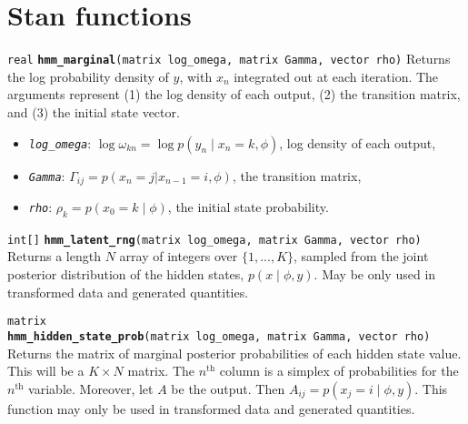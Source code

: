\documentclass[
  10pt,
]{book}
\begin{document}
\hypertarget{hmm-stan-functions}{%
\section{Stan functions}\label{hmm-stan-functions}}


\texttt{real} \textbf{\texttt{hmm\_marginal}}\texttt{(matrix\ log\_omega,\ matrix\ Gamma,\ vector\ rho)}\newline
Returns the log probability density of \(y\), with \(x_n\) integrated out at each iteration.
The arguments represent (1) the log density of each output, (2) the transition matrix, and (3) the initial state vector.

\begin{itemize}
\item
  \emph{\texttt{log\_omega}}: \(\log \omega_{kn} = \log p(y_n \mid x_n = k, \phi)\), log density of each output,
\item
  \emph{\texttt{Gamma}}: \(\Gamma_{ij} = p(x_n = j | x_{n - 1} = i, \phi)\), the transition matrix,
\item
  \emph{\texttt{rho}}: \(\rho_k = p(x_0 = k \mid \phi)\), the initial state probability.
\end{itemize}


\texttt{int{[}{]}} \textbf{\texttt{hmm\_latent\_rng}}\texttt{(matrix\ log\_omega,\ matrix\ Gamma,\ vector\ rho)}\newline
Returns a length \(N\) array of integers over \(\{1, ..., K\}\),
sampled from the joint posterior distribution of the hidden states,
\(p(x \mid \phi, y)\).
May be only used in transformed data and generated quantities.


\texttt{matrix} \textbf{\texttt{hmm\_hidden\_state\_prob}}\texttt{(matrix\ log\_omega,\ matrix\ Gamma,\ vector\ rho)}\newline
Returns the matrix of marginal posterior probabilities of each hidden state value. This will be a \(K \times N\) matrix.
The \(n^\mathrm{th}\) column is a simplex of probabilities for the \(n^\mathrm{th}\) variable.
Moreover, let \(A\) be the output. Then
\(A_{ij} = p(x_j = i \mid \phi, y)\).
This function may only be used in transformed data and generated quantities.
\end{document}
